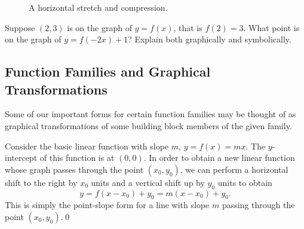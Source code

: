 \begin{figure}[h]
\centering
{} 
\caption{A horizontal stretch and compression.}
\end{figure}

\par

\begin{question} Suppose $(2,3)$ is on the graph of $y=f(x)$, that is $f(2) = 3$. What point is on the graph of $y = f(-2x) + 1$? Explain both graphically and symbolically.
\end{question}


\subsection{Function Families and Graphical Transformations}

Some of our important forms for certain function families may be thought of as graphical transformations of some building block members of the given family.

\begin{eg} Consider the basic linear function with slope $m$, $y = f(x) = mx$. The $y$-intercept of this function is at $(0,0)$. In order to obtain a new linear function whose graph passes through the point $(x_0,y_0)$, we can perform a horizontal shift to the right by $x_0$ units and a vertical shift up by $y_0$ units to obtain
\[
y = f(x-x_0) + y_0 = m(x-x_0) + y_0.
\]
This is simply the point-slope form for a line with slope $m$ passing through the point $(x_0,y_0)$.\qed \end{eg}

